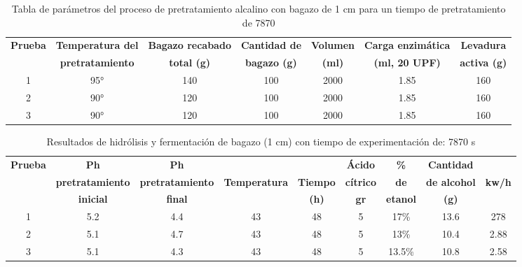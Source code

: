 \documentclass[12pt]{article}
\begin{document}
	
	
	
	
		\begin{table}[H]
		\centering
		\caption{Tabla de parámetros del proceso de pretratamiento alcalino con bagazo de 1 cm para un tiempo de pretratamiento de 7870}
		\label{hidrolisis alcalino 1 cm_7870_1}
		\resizebox{16cm}{!} {
			\begin{tabular}{|c|c|c|c|c|c|c|}
				\hline
				\textbf{Prueba}	& \textbf{Temperatura del} & \textbf{Bagazo recabado} & \textbf{Cantidad de} & \textbf{Volumen} & \textbf{Carga enzimática} & \textbf{Levadura} \\
				&	\textbf{pretratamiento} & \textbf{total (g)} & \textbf{bagazo (g)} & \textbf{(ml)} & \textbf{(ml, 20 UPF)} & \textbf{activa (g)} \\ \hline		
	
				 1&	95° & 140 & 100 & 2000 & 1.85 & 160 \\ \hline
				2	&	90° & 120 & 100 & 2000 & 1.85 & 160 \\ \hline
		
				3	&	90° & 120 & 100 & 2000 & 1.85 & 160 \\ \hline
				
		\end{tabular} }
		
	\end{table}
	
	
	
	
	
	
	
	
		\begin{table}[H]
		\centering
		\caption{Resultados de hidrólisis y fermentación de bagazo (1 cm) con tiempo de experimentación de: 7870 s}
		\label{hidrolisis alcalino 1 cm_7870}
		\resizebox{16cm}{!} {
			\begin{tabular}{|c|c|c|c|c|c|c|c|c|}
				\hline
				\textbf{Prueba}	& \textbf{Ph}& \textbf{Ph} &  &  & \textbf{Ácido} &\textbf{\%} & \textbf{Cantidad} & \\
				&	\textbf{pretratamiento} & 	\textbf{pretratamiento} & \textbf{Temperatura} & \textbf{Tiempo} & \textbf{cítrico} & \textbf{de } & \textbf{de alcohol } & \textbf{kw/h}\\
				&	\textbf{inicial}& \textbf{final} &  &\textbf{(h)}  & \textbf{gr} & \textbf{etanol }& \textbf{(g) }&\\ \hline		
			
				1	&5.2 & 4.4 & 43 & 48 & 5 & 17\% & 13.6 & 278  \\ \hline
				2	&5.1 & 4.7 & 43 & 48 & 5 & 13\% & 10.4 & 2.88  \\ \hline			
				3	&5.1 & 4.3 & 43 & 48 & 5 & 13.5\%& 10.8 & 2.58  \\ \hline
				
				
		\end{tabular} }
		
	\end{table}
	
\end{document}
